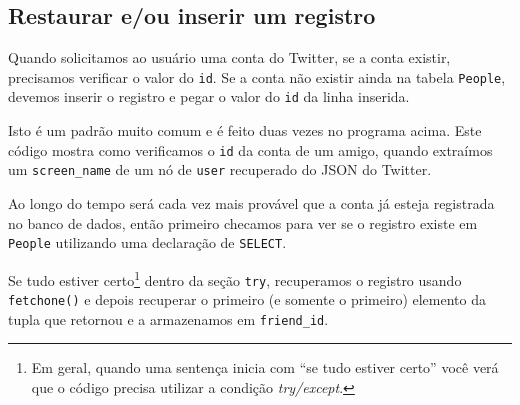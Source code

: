 \subsection{Restaurar e/ou inserir um registro}

Quando solicitamos ao usuário uma conta do Twitter, se a conta existir,
precisamos verificar o valor do {\tt id}. Se a conta não existir ainda
na tabela {\tt People}, devemos inserir o registro e pegar o valor do
{\tt id} da linha inserida.


Isto é um padrão muito comum e é feito duas vezes no programa acima. Este
código mostra como verificamos o {\tt id} da conta de um amigo, quando
extraímos um \verb"screen_name" de um nó de {\tt user} recuperado do JSON
do Twitter.


Ao longo do tempo será cada vez mais provável que a conta já esteja registrada
no banco de dados, então primeiro checamos para ver se o registro existe em
{\tt People} utilizando uma declaração de {\tt SELECT}.


Se tudo estiver certo\footnote{Em geral, quando uma sentença inicia com ``se
  tudo estiver certo'' você verá que o código precisa utilizar a condição
  {\it try/except}.} dentro da seção {\tt try}, recuperamos o registro usando
{\tt fetchone()} e depois recuperar o primeiro (e somente o primeiro) elemento
da tupla que retornou e a armazenamos em \verb"friend_id".

